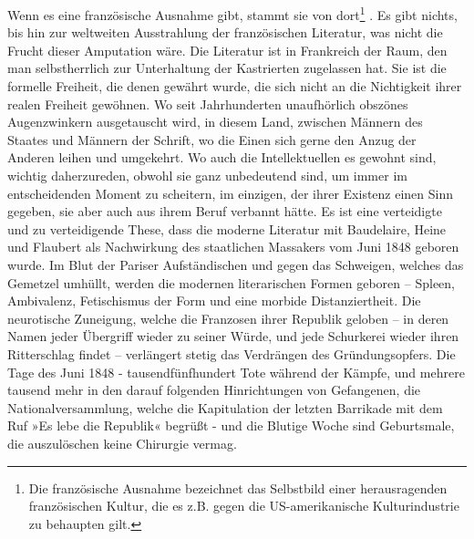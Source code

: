 Wenn es eine französische Ausnahme gibt, stammt sie von dort\footnote{
Die französische Ausnahme bezeichnet das Selbstbild einer
herausragenden französischen Kultur, die es z.B. gegen die
US-amerikanische Kulturindustrie zu behaupten gilt.
}%
. Es
gibt nichts, bis hin zur weltweiten Ausstrahlung der französischen
Literatur, was nicht die Frucht dieser Amputation wäre. Die
Literatur ist in Frankreich der Raum, den man selbstherrlich zur
Unterhaltung der Kastrierten zugelassen hat. Sie ist die formelle
Freiheit, die denen gewährt wurde, die sich nicht an die
Nichtigkeit ihrer realen Freiheit gewöhnen. Wo seit Jahrhunderten
unaufhörlich obszönes Augenzwinkern ausgetauscht wird, in diesem
Land, zwischen Männern des Staates und Männern der Schrift, wo die
Einen sich gerne den Anzug der Anderen leihen und umgekehrt. Wo
auch die Intellektuellen es gewohnt sind, wichtig daherzureden,
obwohl sie ganz unbedeutend sind, um immer im entscheidenden Moment
zu scheitern, im einzigen, der ihrer Existenz einen Sinn gegeben,
sie aber auch aus ihrem Beruf verbannt hätte.
Es ist eine verteidigte und zu verteidigende These, dass die
moderne Literatur mit Baudelaire, Heine und Flaubert als
Nachwirkung des staatlichen Massakers vom Juni 1848 geboren wurde.
Im Blut der Pariser Aufständischen und gegen das Schweigen, welches
das Gemetzel umhüllt, werden die modernen literarischen Formen
geboren – Spleen, Ambivalenz, Fetischismus der Form und eine
morbide Distanziertheit. Die neurotische Zuneigung, welche die
Franzosen ihrer Republik geloben – in deren Namen jeder Übergriff
wieder zu seiner Würde, und jede Schurkerei wieder ihren
Ritterschlag findet – verlängert stetig das Verdrängen des
Gründungsopfers. Die Tage des Juni 1848 - tausendfünfhundert Tote
während der Kämpfe, und mehrere tausend mehr in den darauf
folgenden Hinrichtungen von Gefangenen, die Nationalversammlung,
welche die Kapitulation der letzten Barrikade mit dem Ruf »Es lebe
die Republik« begrüßt - und die Blutige Woche sind Geburtsmale, die
auszulöschen keine Chirurgie vermag.

\extrapar{}

